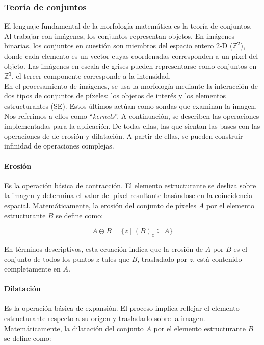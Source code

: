 \documentclass[11pt]{article}
\begin{document}
      \subsubsection{Teoría de conjuntos}

          \noindent
          El lenguaje fundamental de la morfología matemática es la teoría de conjuntos. Al trabajar con imágenes, los conjuntos representan objetos. En imágenes binarias, los conjuntos en cuestión son miembros del espacio entero 2-D (\(\mathbb{Z}^2\)), donde cada elemento es un vector cuyas coordenadas corresponden a un píxel del objeto. Las imágenes en escala de grises pueden representarse como conjuntos en \(\mathbb{Z}^3\), el tercer componente corresponde a la intensidad. \\

          En el procesamiento de imágenes, se usa la morfología mediante la interacción
          de dos tipos de conjuntos de píxeles: los objetos de interés y los elementos
          estructurantes (SE). Estos últimos actúan como sondas que examinan la imagen.
          Nos referimos a ellos como ``\textit{kernels}''. A continuación, se describen
          las operaciones implementadas para la aplicación. De todas ellas, las que
          sientan las bases con las operaciones de de erosión y dilatación. A partir de
          ellas, se pueden construir infinidad de operaciones complejas.

          \paragraph*{Erosión} Es la operación básica de contracción. El elemento
              estructurante se desliza sobre la imagen y determina el valor del píxel
              resultante basándose en la coincidencia espacial. Matemáticamente, la erosión
              del conjunto de píxeles \( A \) por el elemento estructurante \( B \) se define
              como:

              \[ A \ominus B = \{ z \mid (B)_z \subseteq A \} \]

              En términos descriptivos, esta ecuación indica que la erosión de \( A \) por \(
              B \) es el conjunto de todos los puntos \( z \) tales que \( B \), trasladado
              por \( z \), está contenido completamente en \( A \).

          \paragraph*{Dilatación} Es la operación básica de expansión. El proceso implica
              reflejar el elemento estructurante respecto a su origen y trasladarlo sobre la
              imagen. Matemáticamente, la dilatación del conjunto \( A \) por el elemento
              estructurante \( B \) se define como:
\end{document}
